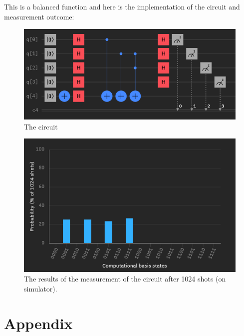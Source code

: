\documentclass[12pt]{article}
\begin{document}
\subsection*{}

This is a balanced function and here is the implementation of the circuit and measurement outcome:

\begin{figure}[H]
    \centering
    \includegraphics[scale=0.9]{2c.png}
    \caption{The circuit}
\end{figure}

\begin{figure}[H]
    \centering
    \includegraphics[scale=0.8]{2cr.png}
    \caption{The results of the measurement of the circuit after 1024 shots (on simulator).}
\end{figure}

\newpage

\section*{Appendix}
\end{document}

